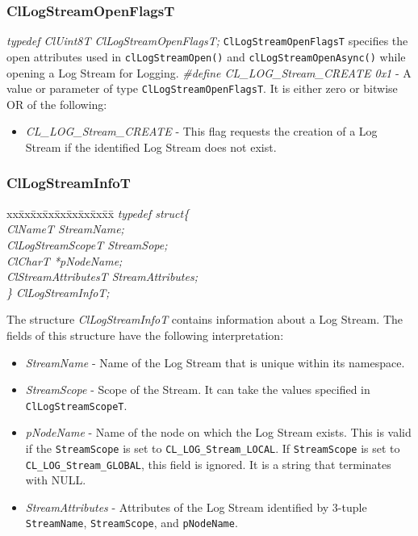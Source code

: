 \begin{flushleft}
\begin{itemize}
\end{itemize}


\subsubsection{ClLogStreamOpenFlagsT}
\textit{typedef ClUint8T ClLogStreamOpenFlagsT;}
\newline
\newline
{\tt{ClLogStreamOpenFlagsT}} specifies the open attributes used in {\tt{clLogStreamOpen()}} and {\tt{clLogStreamOpenAsync()}} while opening a Log Stream
for Logging.
\newline 
\newline
\textit{\#define CL\_\-LOG\_\-Stream\_\-CREATE 0x1} - A value or parameter of type {\tt{ClLogStreamOpenFlagsT}}. It is either zero or bitwise OR of the 
following: 
\begin{itemize}
\item
\textit{CL\_\-LOG\_\-Stream\_\-CREATE} - This flag requests the creation of a Log Stream if the identified Log Stream does not exist.
\end{itemize}
	


\subsubsection{ClLogStreamInfoT}
\begin{tabbing}
xx\=xx\=xx\=xx\=xx\=xx\=xx\=xx\=xx\=\kill
\textit{typedef struct\{}\\
\>\>\>\>\textit{ClNameT			StreamName;}\\
\>\>\>\>\textit{ClLogStreamScopeT		StreamSope;}\\
\>\>\>\>\textit{ClCharT			*pNodeName;}\\
\>\>\>\>\textit{ClStreamAttributesT	StreamAttributes;}\\
\textit{\} ClLogStreamInfoT;}\end{tabbing}
The structure \textit{ClLogStreamInfoT} contains information about a Log Stream. The fields of this structure have the following interpretation:
\begin{itemize}
\item
\textit{StreamName} - Name of the Log Stream that is unique within its namespace.
\item
\textit{StreamScope} - Scope of the Stream. It can take the values specified in {\tt{ClLogStreamScopeT}}.
\item
\textit{pNodeName} - Name of the node on which the Log Stream exists. This is valid if the {\tt{StreamScope}} is set to {\tt{CL\_\-LOG\_\-Stream\_\-LOCAL}}. If 
{\tt{StreamScope}} is set to {\tt{CL\_\-LOG\_\-Stream\_\-GLOBAL}}, this field is ignored. It is a string that terminates with NULL.
\item
\textit{StreamAttributes} - Attributes of the Log Stream identified by 3-tuple {\tt{StreamName}}, {\tt{StreamScope}}, and {\tt{pNodeName}}.
\end{itemize}



\end{flushleft}
